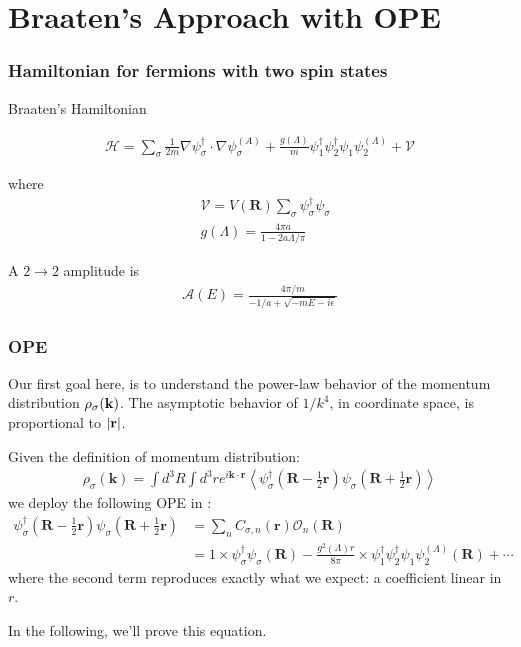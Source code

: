 \section{Braaten's Approach with OPE}

\begin{frame}
	\frametitle{Hamiltonian for fermions with two spin states}

	\begin{alertblock}{Braaten's Hamiltonian}

		\begin{align}
			\mathcal{H}=\sum_{\sigma} \frac{1}{2 m} \nabla \psi_{\sigma}^{\dagger} \cdot \nabla \psi_{\sigma}^{(A)}+\frac{g(\Lambda)}{m} \psi_{1}^{\dagger} \psi_{2}^{\dagger} \psi_{1} \psi_{2}^{(\Lambda)}+\mathcal{V}
		\end{align}
	\end{alertblock}
	where
	\begin{align*}
		  & \mathcal{V}=V(\boldsymbol{R}) \sum_{\sigma} \psi_{\sigma}^{\dagger} \psi_{\sigma} \\
		  & g(\Lambda)=\frac{4 \pi a}{1-2 a \Lambda / \pi}
	\end{align*}

	A $2\to 2$ amplitude is
	\begin{align}
		\mathcal{A}(E)=\frac{4 \pi / m}{-1 / a+\sqrt{-m E-i \epsilon}}
	\end{align}
\end{frame}
\begin{frame}
	\frametitle{OPE}
	Our first goal here, is to understand the power-law behavior of the momentum distribution $\rho_\sigma(\vb{k})$. The asymptotic behavior of $1/k^4$, in coordinate space, is proportional to $\abs{\vb{r}}$.

	Given the definition of momentum distribution:
	\begin{align}
		\rho_{\sigma}(\boldsymbol{k})=\int d^{3} R \int d^{3} r e^{i \boldsymbol{k} \cdot \boldsymbol{r}}\left\langle\psi_{\sigma}^{\dagger}\left(\boldsymbol{R}-\frac{1}{2} \boldsymbol{r}\right) \psi_{\sigma}\left(\boldsymbol{R}+\frac{1}{2} \boldsymbol{r}\right)\right\rangle
	\end{align}
	we deploy the following OPE in \textcite{Braaten2008}:
	\begin{align}
		\psi_{\sigma}^{\dagger}\left(\boldsymbol{R}-\frac{1}{2} \boldsymbol{r}\right) \psi_{\sigma}\left(\boldsymbol{R}+\frac{1}{2} \boldsymbol{r}\right) & =\sum_{n} C_{\sigma, n}(\boldsymbol{r}) \mathcal{O}_{n}(\boldsymbol{R})                                                                                                               \\
		                                                                                                                                                  & =1\times\psi_{\sigma}^{\dagger} \psi_{\sigma}(\mathbf{R})-\frac{g^{2}(\Lambda) r} {8 \pi}\times\psi_{1}^{\dagger} \psi_{2}^{\dagger} \psi_{1} \psi_{2}^{(\Lambda)}(\mathbf{R})+\cdots
	\end{align}
	where the second term reproduces exactly what we expect: a coefficient linear in $r$.

	In the following, we'll prove this equation.
\end{frame}
